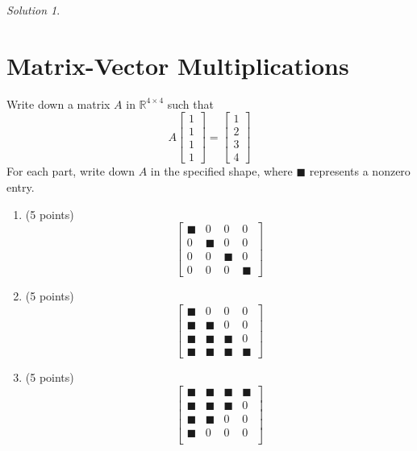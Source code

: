 \documentclass{article}
\theoremstyle{remark}
\newtheorem*{solution}{Solution}
\begin{document}
\begin{solution}
\end{solution}

\pagebreak
\section{Matrix-Vector Multiplications}

Write down a matrix $A$ in $\mathbb R^{4 \times 4}$ such that
\begin{displaymath}
  A
  \begin{bmatrix}
    1 \\ 1 \\ 1 \\ 1
  \end{bmatrix}
  =
  \begin{bmatrix}
    1 \\ 2 \\ 3 \\ 4
  \end{bmatrix}
\end{displaymath}
For each part, write down $A$ in the specified shape, where $\blacksquare$ represents a nonzero entry.
{
  \newcommand{\bs}{\blacksquare}
  \begin{enumerate}
  \item (5 points)
    \begin{displaymath}
      \begin{bmatrix}
        \bs&0&0&0 \\
        0&\bs&0&0 \\
        0&0&\bs&0 \\
        0&0&0&\bs
      \end{bmatrix}
    \end{displaymath}
  \item (5 points)
    \begin{displaymath}
      \begin{bmatrix}
        \bs&0&0&0 \\
        \bs&\bs&0&0 \\
        \bs&\bs&\bs&0 \\
        \bs&\bs&\bs&\bs
      \end{bmatrix}
    \end{displaymath}
  \item (5 points)
    \begin{displaymath}
      \begin{bmatrix}
        \bs&\bs&\bs&\bs \\
        \bs&\bs&\bs&0 \\
        \bs&\bs&0&0 \\
        \bs&0&0&0 \\
      \end{bmatrix}
    \end{displaymath}
  \end{enumerate}
}
\end{document}
